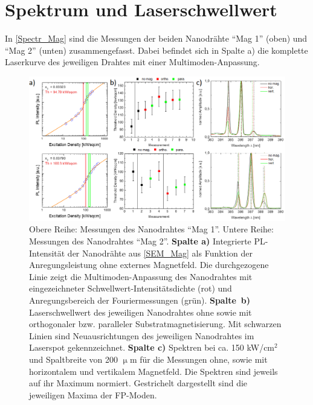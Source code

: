 \section{Spektrum und Laserschwellwert}
In \autoref{Spectr_Mag} sind die Messungen der beiden Nanodrähte ``Mag 1'' (oben) und ``Mag 2'' (unten) zusammengefasst. Dabei befindet sich in Spalte a) die komplette Laserkurve des jeweiligen Drahtes mit einer Multimoden-Anpassung.\begin{figure}[b]
\centering
\includegraphics[width=1\textwidth]{Bilder/Mag/Spectr_Mag}
\caption{Obere Reihe: Messungen des Nanodrahtes ``Mag 1''. Untere Reihe: Messungen des Nanodrahtes ``Mag 2''. \textbf{Spalte a)} Integrierte PL-Intensität der Nanodrähte aus \autoref{SEM_Mag} als Funktion der Anregungsleistung ohne externes Magnetfeld. Die durchgezogene Linie zeigt die Multimoden-Anpassung des Nanodrahtes mit eingezeichneter Schwellwert-Intensitätsdichte (rot) und Anregungsbereich der Fouriermessungen (grün). \mbox{\textbf{Spalte b)}} Laserschwellwert des jeweiligen Nanodrahtes ohne sowie mit orthogonaler bzw. paralleler Substratmagnetisierung. Mit schwarzen Linien sind Neuausrichtungen des jeweiligen Nanodrahtes im Laserspot gekennzeichnet. \textbf{Spalte c)} Spektren bei ca. 150 kW/cm$^\text{2}$ und Spaltbreite von 200 $\upmu$m für die Messungen ohne, sowie mit horizontalem und vertikalem Magnetfeld. Die Spektren sind jeweils auf ihr Maximum normiert. Gestrichelt dargestellt sind die jeweiligen Maxima der FP-Moden.}
\label{Spectr_Mag}

\end{figure}
